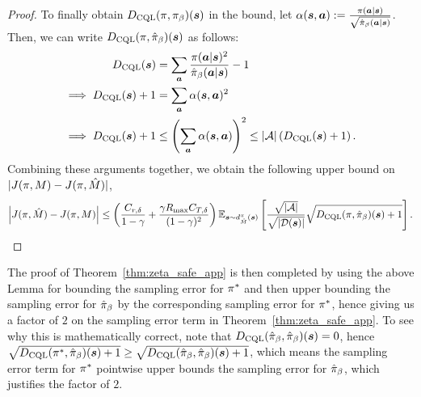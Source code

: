 \begin{proof}
To finally obtain $D_{\text{CQL}}(\pi, {\pi_\beta})(\boldsymbol{s})$ in the bound, let $\alpha(\boldsymbol{s}, \boldsymbol{a}) := \frac{\pi(\boldsymbol{a}|\boldsymbol{s})}{\sqrt{\hat{\pi}_\beta(\boldsymbol{a}|\boldsymbol{s})}}$. Then, we can write $D_{\text{CQL}}(\pi, \hat{\pi}_\beta)(\boldsymbol{s})$ as follows:
\begin{align*}
    D_\text{CQL}(\boldsymbol{s}) &= \sum_{\boldsymbol{a}} \frac{\pi(\boldsymbol{a}|\boldsymbol{s})^2}{\hat{\pi}_\beta(\boldsymbol{a}|\boldsymbol{s})} - 1\\
    \implies D_{\text{CQL}}(\boldsymbol{s}) + 1 &= \sum_{\boldsymbol{a}} \alpha(\boldsymbol{s}, \boldsymbol{a})^{2}\\
    \implies D_{\text{CQL}}(\boldsymbol{s}) + 1 &\leq \left(\sum_{\boldsymbol{a}} \alpha(\boldsymbol{s},\boldsymbol{a})\right)^2 \leq |\mathcal{A}| \left(D_\text{CQL}(\boldsymbol{s}) + 1 \right).
\end{align*}
Combining these arguments together, we obtain the following upper bound on $|J(\pi, M) - J(\pi, \hat{M})|$,
\begin{equation*}
    \left\vert J(\pi, \hat{M}) - J(\pi, M) \right\vert \leq \left({\frac{C_{r, \delta}}{1 - \gamma} + \frac{\gamma R_{\max} C_{T, \delta}}{(1 - \gamma)^2}} \right)\mathbb{E}_{\boldsymbol{s} \sim d^{\pi}_{\hat{M}}(\boldsymbol{s})}\left[ \frac{\sqrt{|\mathcal{A}|}}{\sqrt{|\mathcal{D}(\boldsymbol{s})|}} \sqrt{ D_{\text{CQL}}(\pi, \hat{\pi}_\beta)(\boldsymbol{s}) + 1} \right].
\end{equation*}
\end{proof}
The proof of Theorem~\ref{thm:zeta_safe_app} is then completed by using the above Lemma for bounding the sampling error for $\pi^*$ and then upper bounding the sampling error for $\hat{\pi}_\beta$ by the corresponding sampling error for $\pi^*$, hence giving us a factor of $2$ on the sampling error term in Theorem~\ref{thm:zeta_safe_app}. To see why this is mathematically correct, note that $D_{\text{CQL}}(\hat{\pi}_\beta, \hat{\pi}_\beta)(\boldsymbol{s}) = 0$, hence $\sqrt{D_{\text{CQL}}(\pi^*, \hat{\pi}_\beta)(\boldsymbol{s}) + 1} \geq \sqrt{D_{\text{CQL}}(\hat{\pi}_\beta, \hat{\pi}_\beta)(\boldsymbol{s}) + 1}$, which means the sampling error term for $\pi^*$ pointwise upper bounds the sampling error for $\hat{\pi}_\beta$, which justifies the factor of $2$.


